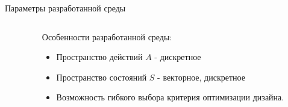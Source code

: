 \documentclass[11pt, aspectratio=169]{beamer}
\newcommand{\bb}[1]{\mathbb{#1}}
\begin{document}



\begin{frame}{Параметры разработанной среды}
    \begin{columns}[onlytextwidth]
        \begin{column}{0.59\textwidth}
        \end{column}
        \begin{column}{0.4\textwidth}
            Особенности разработанной среды:
            \begin{itemize}
                \item Пространство действий $A$ - дискретное
                \item Пространство состояний $S$ - векторное, дискретное
                \item Возможность гибкого выбора критерия оптимизации дизайна.
            \end{itemize}
        \end{column}
    \end{columns}
\end{frame}
\end{document}
